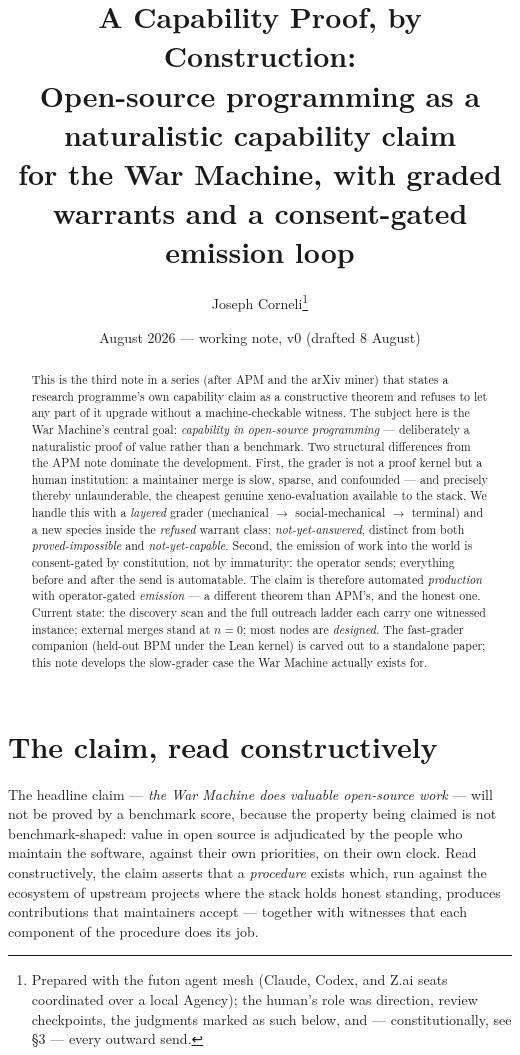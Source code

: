 \documentclass[11pt]{article}
\title{A Capability Proof, by Construction:\\
\large Open-source programming as a naturalistic capability claim\\
for the War Machine, with graded warrants and a consent-gated
emission loop}
\author{Joseph Corneli\thanks{Prepared with the futon agent mesh
(Claude, Codex, and Z.ai seats coordinated over a local Agency);
the human's role was direction, review checkpoints, the judgments
marked as such below, and --- constitutionally, see \S3 --- every
outward send.}}
\date{August 2026 --- working note, v0 (drafted 8 August)}
\newcommand{\warrant}[1]{\textsl{#1}}
\begin{document}
\maketitle

\begin{abstract}\noindent
This is the third note in a series (after APM and the arXiv miner)
that states a research programme's own capability claim as a
constructive theorem and refuses to let any part of it upgrade
without a machine-checkable witness. The subject here is the War
Machine's central goal: \emph{capability in open-source programming}
--- deliberately a naturalistic proof of value rather than a
benchmark. Two structural differences from the APM note dominate the
development. First, the grader is not a proof kernel but a human
institution: a maintainer merge is slow, sparse, and confounded ---
and precisely thereby unlaunderable, the cheapest genuine
xeno-evaluation available to the stack. We handle this with a
\emph{layered} grader (mechanical $\to$ social-mechanical $\to$
terminal) and a new species inside the \warrant{refused} warrant
class: \emph{not-yet-answered}, distinct from both
\emph{proved-impossible} and \emph{not-yet-capable}. Second, the
emission of work into the world is consent-gated by constitution, not
by immaturity: the operator sends; everything before and after the
send is automatable. The claim is therefore automated
\emph{production} with operator-gated \emph{emission} --- a different
theorem than APM's, and the honest one. Current state: the discovery
scan and the full outreach ladder each carry one witnessed instance;
external merges stand at $n{=}0$; most nodes are \warrant{designed}.
The fast-grader companion (held-out BPM under the Lean kernel) is
carved out to a standalone paper; this note develops the slow-grader
case the War Machine actually exists for.
\end{abstract}

\section{The claim, read constructively}

The headline claim --- \emph{the War Machine does valuable
open-source work} --- will not be proved by a benchmark score,
because the property being claimed is not benchmark-shaped: value in
open source is adjudicated by the people who maintain the software,
against their own priorities, on their own clock. Read
constructively, the claim asserts that a \emph{procedure} exists
which, run against the ecosystem of upstream projects where the
stack holds honest standing, produces contributions that maintainers
accept --- together with witnesses that each component of the
procedure does its job.
\end{document}
